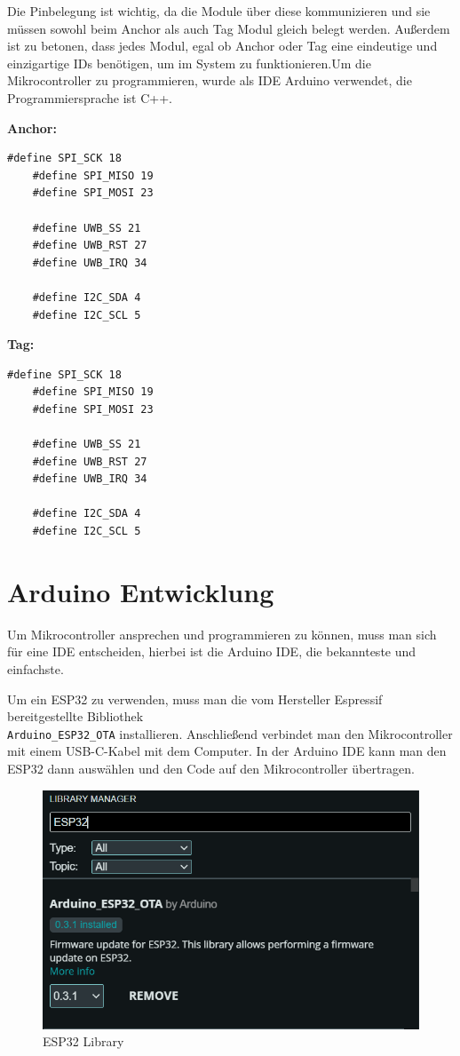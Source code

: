 Die Pinbelegung ist wichtig, da die Module über diese kommunizieren und sie müssen sowohl beim Anchor als auch Tag Modul gleich belegt werden. Außerdem ist zu betonen, dass jedes Modul, egal ob Anchor oder Tag eine eindeutige und einzigartige IDs benötigen, um im System zu funktionieren.Um die Mikrocontroller zu programmieren, wurde als IDE Arduino verwendet, die Programmiersprache ist C++.

\newpage
\textbf{Anchor:}
\begin{lstlisting}[style=C++, caption=Pinbelegung für Anchor, captionpos=b]
	#define SPI_SCK 18
	#define SPI_MISO 19
	#define SPI_MOSI 23
	
	#define UWB_SS 21
	#define UWB_RST 27
	#define UWB_IRQ 34 
	
	#define I2C_SDA 4
	#define I2C_SCL 5
\end{lstlisting}


\textbf{Tag:}
\begin{lstlisting}[style=C++, caption=Pinbelegung für Tag, captionpos=b]
	#define SPI_SCK 18
	#define SPI_MISO 19
	#define SPI_MOSI 23
	
	#define UWB_SS 21
	#define UWB_RST 27
	#define UWB_IRQ 34 
	
	#define I2C_SDA 4
	#define I2C_SCL 5
\end{lstlisting}

\newpage
\section{Arduino Entwicklung}
Um Mikrocontroller ansprechen und programmieren zu können, muss man sich für eine IDE entscheiden, hierbei ist die Arduino IDE, \textcite{Arduino}
die bekannteste und einfachste.

Um ein ESP32 zu verwenden, muss man die vom Hersteller Espressif bereitgestellte Bibliothek \\ \texttt{Arduino\_ESP32\_OTA} installieren. Anschließend verbindet man den Mikrocontroller mit einem USB-C-Kabel mit dem Computer. In der Arduino IDE kann man den ESP32 dann auswählen und den Code auf den Mikrocontroller übertragen.

\begin{figure}[H]
	\centering
	\includegraphics[width=0.9\linewidth]{images/ArduinoLib.png}
	\caption[ESP32Library]{ESP32 Library}
	\label{fig:ESP32Lib}
\end{figure}

